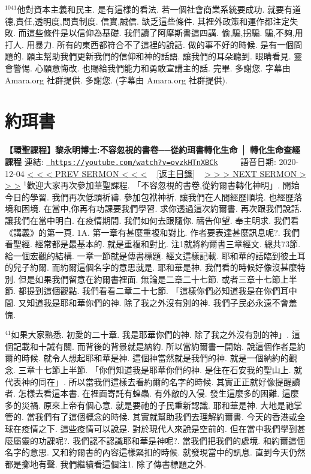 \documentclass{book}
\begin{document}
$^{1041}$他對資本主義和民主.
是有這樣的看法.
若一個社會商業系統要成功.
就要有道德,責任,透明度,問責制度.
信實,誠信.
缺乏這些條件.
其裡外政策和運作都注定失敗.
而這些條件是以信仰為基礎.
我們讀了阿摩斯書這四講.
偷,騙,拐騙.
騙,不夠,用打人.
用暴力.
所有的東西都符合不了這裡的說話.
做的事不好的時候.
是有一個問題的.
願主幫助我們更新我們的信仰和神的話語.
讓我們的耳朵聽到.
眼睛看見.
靈會警惕.
心願意悔改.
也賜給我們能力和勇敢宣講主的話.
完畢.
多謝您.
字幕由 Amara.org 社群提供.
多謝您.
(字幕由 Amara.org 社群提供).
\newpage



\section{約珥書}
\label{sec:ovzkHTnXBCk}
\textbf{【環聖課程】黎永明博士:不容忽視的書卷──從約珥書轉化生命 │ 轉化生命查經課程}
\newline
\newline
連結: \href{https://youtube.com/watch?v=ovzkHTnXBCk}{\texttt{ https://youtube.com/watch?v=ovzkHTnXBCk}} ~~~~ 語音日期: 2020-12-04 
\newline
\newline
\hyperref[sec:s7QrDPLqvfM]{\small{< < < PREV SERMON < < <}}
~
\hyperref[sec:index]{\small{[返主目錄]}}
~
\hyperref[sec:kGnhU90Nb7o]{\small{> > > NEXT SERMON > > >}}
\newline
\newline
$^{1}$歡迎大家再次參加華聖課程.
「不容忽視的書卷,從約爾書轉化神明」.
開始今日的學習.
我們再次低頭祈禱.
參加包袱神祈.
讓我們在人間經歷順境.
也經歷落境和困境.
在當中,你再有功課要我們學習.
求你透過這次約爾書.
再次跟我們說話.
讓我們在當中明白.
在疫情期間.
我們如何去跟隨你.
禱告仰望.
奉主明求.
我們看《講義》的第一頁.
1A.
第一章有甚麼重複和對比.
作者要表達甚麼訊息呢?.
我們看聖經.
經常都是最基本的.
就是重複和對比.
注1就將約爾書三章經文.
總共73節.
給一個宏觀的結構.
一章一節就是傳書標題.
經文這樣記載.
耶和華的話臨到彼土耳的兒子約爾.
而約爾這個名字的意思就是.
耶和華是神.
我們看的時候好像沒甚麼特別.
但是如果我們留意在約爾書裡面.
無論是二章二十七節.
或者三章十七節上半節.
都提到這個觀點.
我們看看二章二十七節.
「這樣你們必知道我是在你們耳中間.
又知道我是耶和華你們的神.
除了我之外沒有別的神.
我們子民必永遠不會羞愧.

$^{41}$如果大家熟悉.
初愛的二十章.
我是耶華你們的神.
除了我之外沒有別的神」.
這個記載和十誡有關.
而背後的背景就是納約.
所以當約爾書一開始.
說這個作者是約爾的時候.
就令人想起耶和華是神.
這個神當然就是我們的神.
就是一個納約的觀念.
三章十七節上半節.
「你們知道我是耶華你們的神.
是住在石安我的聖山上.
就代表神的同在」.
所以當我們這樣去看約爾的名字的時候.
其實正正就好像提醒讀者.
怎樣去看這本書.
在裡面寄託有蝗蟲.
有外敵的入侵.
發生這麼多的困難.
這麼多的災禍.
原來上帝有個心意.
就是要祂的子民重新認識.
耶和華是神.
大地是祂掌管的.
當我們有了這個概念的時候.
其實就幫助我們去理解約爾書.
今天的香港或全球在疫情之下.
這些疫情可以說是.
對於現代人來說是空前的.
但在當中我們學到甚麼屬靈的功課呢?.
我們認不認識耶和華是神呢?.
當我們把我們的處境.
和約爾這個名字的意思.
又和約爾書的內容這樣緊扣的時候.
就發現當中的訊息.
直到今天仍然都是擲地有聲.
我們繼續看這個注1.
除了傳書標題之外.
\end{document}

